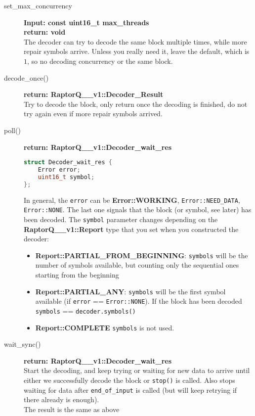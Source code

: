 \documentclass[11pt,a4paper]{refart}
\begin{document}
\begin{description}
\item[set\_max\_concurrency] \textbf{Input: const uint16\_t max\_threads}\\
\textbf{return: void}\\
The decoder can try to decode the same block multiple times, while more repair symbols arrive.
Unless you really need it, leave the default, which is $1$, so no decoding concurrency or the same block.

\item[decode\_once()] \textbf{return: RaptorQ\_\_v1::Decoder\_Result}\\
Try to decode the block, only return once the decoding is finished, do not try again even if more repair symbols arrived.

\item[poll()] \textbf{return: RaptorQ\_\_v1::Decoder\_wait\_res}\\
\begin{lstlisting}[language=c++]
struct Decoder_wait_res {
	Error error;
	uint16_t symbol;
};
\end{lstlisting}
In general, the \texttt{error} can be \textbf{Error::WORKING}, \texttt{Error::NEED\_DATA}, \texttt{Error::NONE}. The last one signals that the block (or symbol, see later) has been decoded.
The \texttt{symbol} parameter changes depending on the \textbf{RaptorQ\_\_v1::Report} type that you set when you constructed the decoder:
\begin{itemize}
	\item \textbf{Report::PARTIAL\_FROM\_BEGINNING}: \texttt{symbols} will be the number of symbols available, but counting only the sequential ones starting from the beginning
	\item \textbf{Report::PARTIAL\_ANY}: \texttt{symbols} will be the first symbol available (if \texttt{error} == \texttt{Error::NONE}). If the block has been decoded \texttt{symbols} == \texttt{decoder.symbols()}
	\item \textbf{Report::COMPLETE} \texttt{symbols} is not used. 
\end{itemize}


\item[wait\_sync()] \textbf{return: RaptorQ\_\_v1::Decoder\_wait\_res}\\
Start the decoding, and keep trying or waiting for new data to arrive until either we successfully decode the block or \texttt{stop()} is called. Also stops waiting for data after \texttt{end\_of\_input} is called (but will keep retrying if there already is enough).\\
The result is the same as above


\end{description}
\end{document}
